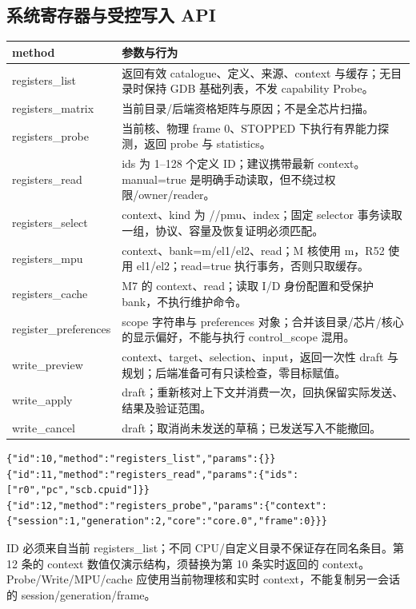 \documentclass[UTF8,a4paper,11pt,oneside,fontset=none]{ctexart}
\newcommand{\code}[1]{\texttt{\detokenize{#1}}}
\begin{document}
\subsection{系统寄存器与受控写入 API}
\begin{longtable}{@{}P{44mm}P{117mm}@{}}
\toprule method & 参数与行为\\\midrule\endhead
registers\_list & 返回有效 catalogue、定义、来源、context 与缓存；无目录时保持 GDB 基础列表，不发 capability Probe。\\
registers\_matrix & 当前目录/后端资格矩阵与原因；不是全芯片扫描。\\
registers\_probe & 当前核、物理 frame 0、STOPPED 下执行有界能力探测，返回 probe 与 statistics。\\
registers\_read & ids 为 1--128 个定义 ID；建议携带最新 context。manual=true 是明确手动读取，但不绕过权限/owner/reader。\\
registers\_select & context、kind 为 \code{mpu_el1}/\code{mpu_el2}/pmu、index；固定 selector 事务读取一组，协议、容量及恢复证明必须匹配。\\
registers\_mpu & context、bank=m/el1/el2、read；M 核使用 m，R52 使用 el1/el2；read=true 执行事务，否则只取缓存。\\
registers\_cache & M7 的 context、read；读取 I/D 身份配置和受保护 bank，不执行维护命令。\\
register\_preferences & scope 字符串与 preferences 对象；合并该目录/芯片/核心的显示偏好，不能与执行 control\_scope 混用。\\
write\_preview & context、target、selection、input，返回一次性 draft 与规划；后端准备可有只读检查，零目标赋值。\\
write\_apply & draft；重新核对上下文并消费一次，回执保留实际发送、结果及验证范围。\\
write\_cancel & draft；取消尚未发送的草稿；已发送写入不能撤回。\\\bottomrule
\end{longtable}
\begin{lstlisting}
{"id":10,"method":"registers_list","params":{}}
{"id":11,"method":"registers_read","params":{"ids":["r0","pc","scb.cpuid"]}}
{"id":12,"method":"registers_probe","params":{"context":{"session":1,"generation":2,"core":"core.0","frame":0}}}
\end{lstlisting}
ID 必须来自当前 registers\_list；不同 CPU/自定义目录不保证存在同名条目。第 12 条的 context 数值仅演示结构，须替换为第 10 条实时返回的 context。Probe/Write/MPU/cache 应使用当前物理核和实时 context，不能复制另一会话的 session/generation/frame。
\end{document}
